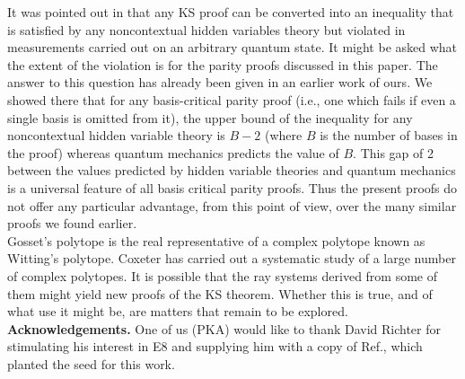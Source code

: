 It was pointed out in \cite{badziag} that any KS proof can be converted into an inequality that is satisfied by any noncontextual hidden variables theory but violated in measurements carried out on an arbitrary quantum state. It might be asked what the extent of the violation is for the parity proofs discussed in this paper. The answer to this question has already been given in an earlier work of ours\cite{Waegell2011b}. We showed there that for any basis-critical parity proof (i.e., one which fails if even a single basis is omitted from it), the upper bound of the inequality for any noncontextual hidden variable theory is $B-2$ (where $B$ is the number of bases in the proof) whereas quantum mechanics predicts the value of $B$.  This gap of 2 between the values predicted by hidden variable theories and quantum mechanics is a universal feature of all basis critical parity proofs. Thus the present proofs do not offer any particular advantage, from this point of view, over the many similar proofs\cite{Waegell2011c,Waegell2012a,Waegell2013,Waegell2011b,Waegell2014} we found earlier.\\

Gosset's polytope is the real representative of a complex polytope known as Witting's polytope\cite{leonardo}. Coxeter\cite{coxeter2} has carried out a systematic study of a large number of complex polytopes. It is possible that the ray systems derived from some of them might yield new proofs of the KS theorem. Whether this is true, and of what use it might be, are matters that remain to be explored.\\

{\bf Acknowledgements.} One of us (PKA) would like to thank David Richter for stimulating his interest in E8 and supplying him with a copy of Ref.\cite{richter}, which planted the seed for this work. \\

\clearpage

